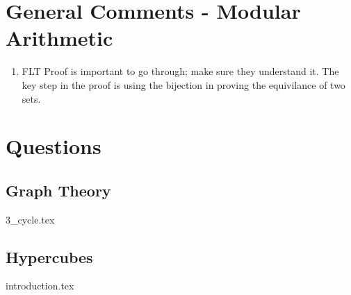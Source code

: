 \documentclass{exam}
\begin{document}
\section{General Comments - Modular Arithmetic}
\begin{enumerate}
\item FLT Proof is important to go through; make sure they understand it. The key step in the proof is using the bijection in proving the equivilance of two sets.
\end{enumerate}


\clearpage 

\section{Questions}
\subsection{Graph Theory}
\begin{enumerate}
{3_cycle.tex}
\end{enumerate}

\subsection{Hypercubes}
\begin{enumerate}
{introduction.tex}
\end{enumerate}
\end{document}
